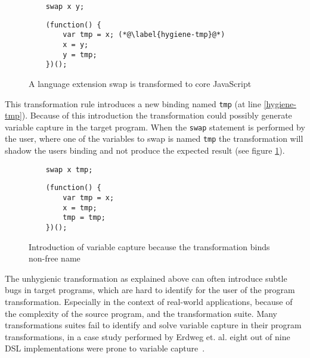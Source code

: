 \begin{figure}[!h]
\begin{minipage}{0.45\textwidth}
	\begin{lstlisting}
	swap x y;
	\end{lstlisting}
\end{minipage}
\hfill
\begin{minipage}{0.45\textwidth}
	\begin{lstlisting}
	(function() {
		var tmp = x; (*@\label{hygiene-tmp}@*)
		x = y;
		y = tmp;
	})();
	\end{lstlisting}
\end{minipage}

\caption{A language extension swap is transformed to core JavaScript}
\end{figure}

This transformation rule introduces a new binding named \lstinline$tmp$ (at line \ref{hygiene-tmp}). Because of this introduction the transformation could possibly generate variable capture in the target program. When the \lstinline$swap$ statement is performed by the user, where one of the variables to swap is named \lstinline$tmp$ the transformation will shadow the users binding and not produce the expected result (see figure \ref{fig:unhygienic}).

\begin{figure}[!h] 
\label{fig:unhygienic}
\begin{minipage}{0.45\textwidth}
	\begin{lstlisting}
	swap x tmp;
	\end{lstlisting}
\end{minipage}
\hfill
\begin{minipage}{0.45\textwidth}
	\begin{lstlisting}
	(function() {
		var tmp = x;
		x = tmp;
		tmp = tmp;
	})();
	\end{lstlisting}
\end{minipage}
\caption{Introduction of variable capture because the transformation binds non-free name}
\end{figure}

The unhygienic transformation as explained above can often introduce subtle bugs in target programs, which are hard to identify for the user of the program transformation. Especially in the context of real-world applications, because of the complexity of the source program, and the transformation suite. Many transformations suites fail to identify and solve variable capture in their program transformations, in a case study performed by Erdweg et. al. eight out of nine DSL implementations were prone to variable capture~\cite{Erdweg2014a}.

